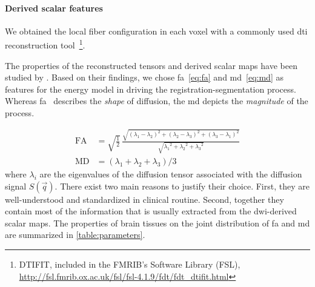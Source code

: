 \paragraph{Derived scalar features}
We obtained the local fiber configuration in each voxel with a commonly 
used \gls{dti} reconstruction tool~\footnote{DTIFIT, included
in the FMRIB's Software Library (FSL), 
\url{http://fsl.fmrib.ox.ac.uk/fsl/fsl-4.1.9/fdt/fdt_dtifit.html}}. 

The properties of
the reconstructed tensors and derived scalar maps have been
studied by \cite{ennis_orthogonal_2006}. Based on their
findings, we chose \gls{fa}~\eqref{eq:fa} 
and \gls{md}~\eqref{eq:md} as features for the energy model in driving
the registration-segmentation process. 
Whereas \gls{fa} \ describes the \emph{shape} of diffusion, 
the \gls{md} depicts the \emph{magnitude} of the process. 

\begin{align}
\mathrm{FA} &= \sqrt{ \frac{1}{2}}\,\frac{\sqrt{ (\lambda_1 - \lambda_2)^2 + (\lambda_2 - \lambda_3)^2 + (\lambda_3 - \lambda_1)^2}}{\sqrt{ {\lambda_1}^2 + {\lambda_2}^2 + {\lambda_3}^2}} \label{eq:fa} \\
\mathrm{MD} &= ( \lambda_1 + \lambda_2 + \lambda_3 ) / 3 \label{eq:md}
\end{align}
where $\lambda_i$ are the eigenvalues of the diffusion tensor 
associated with the diffusion signal $S(\vec{q})$. There exist 
two main reasons to justify their choice. 
First, they are well-understood and standardized in clinical routine.
Second, together they contain most of the information that is
usually extracted from the \gls{dwi}-derived scalar maps. The properties
of brain tissues on the joint distribution of \gls{fa} and \gls{md} are 
summarized in \autoref{table:parameters}. \\

